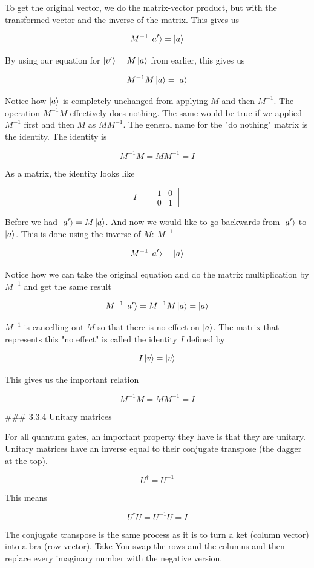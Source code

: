 \documentclass{book}
\begin{document}
To get the original vector, we do the matrix-vector product, but with the transformed vector and the inverse of the matrix. This gives us 

$$
M^{-1}\ket{a'} = \ket{a}
$$

By using our equation for $\ket{v'} = M\ket{a}$ from earlier, this gives us 

$$
M^{-1}M\ket{a} = \ket{a}
$$

Notice how $\ket{a}$ is completely unchanged from applying $M$ and then $M^{-1}$. The operation $M^{-1}M$ effectively does nothing. The same would be true if we applied $M^{-1}$ first and then $M$ as $MM^{-1}$. The general name for the "do nothing" matrix is the identity. The identity is

$$M^{-1}M = MM^{-1} = I $$

As a matrix, the identity looks like 

$$ 
I = \begin{bmatrix} 1 & 0 \\ 0 & 1 \end{bmatrix}
$$

Before we had $\ket{a'} = M\ket{a}$. And now we would like to go backwards from $\ket{a'}$ to $\ket{a}$. This is done using the inverse of $M$: $M^{-1}$

$$
 M^{-1}\ket{a'} = \ket{a} 
$$

Notice how we can take the original equation and do the matrix multiplication by $M^{-1}$ and get the same result

$$
M^{-1}\ket{a'} = M^{-1}M\ket{a} = \ket{a}
$$

$M^{-1}$ is cancelling out $M$ so that there is no effect on $\ket{a}$. The matrix that represents this "no effect" is called the identity $I$ defined by 


$$ I\ket{v} = \ket{v}$$

This gives us the important relation 


$$ M^{-1}M = MM^{-1} = I $$

### 3.3.4 Unitary matrices 

For all quantum gates, an important property they have is that they are unitary. Unitary matrices have an inverse equal to their conjugate transpose (the dagger at the top).

$$ U^\dagger = U^{-1} $$

This means 

$$ U^\dagger U = U^{-1}U = I $$

The conjugate transpose is the same process as it is to turn a ket (column vector) into a bra (row vector). Take You swap the rows and the columns and then replace every imaginary number with the negative version. 
\end{document}
